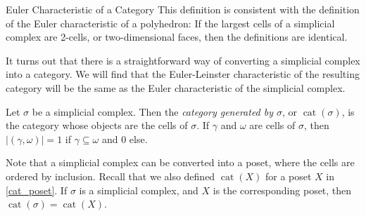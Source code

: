\documentclass[12pt]{pom_thesis}
\DeclareMathOperator{\cat}{cat}
\begin{document}
\begin{chapter}{Euler Characteristic of a Category}
This definition is consistent with the definition of the Euler characteristic of a polyhedron: If the largest cells of a simplicial complex are 2-cells, or two-dimensional faces, then the definitions are identical. 

It turns out that there is a straightforward way of converting a simplicial complex into a category. We will find that the Euler-Leinster characteristic of the resulting category will be the same as the Euler characteristic of the simplicial complex. 
\begin{defn}
Let $\sigma$ be a simplicial complex. Then the \emph{category generated by $\sigma$}, or $\cat(\sigma)$, is the category whose objects are the cells of $\sigma$. If $\gamma$ and $\omega$ are cells of $\sigma$, then $|(\gamma, \omega)| = 1$ if $\gamma \subseteq \omega$ and 0 else.
\end{defn}
Note that a simplicial complex can be converted into a poset, where the cells are ordered by inclusion. Recall that we also defined $\cat(X)$ for a poset $X$ in \ref{cat_poset}. If $\sigma$ is a simplicial complex, and $X$ is the corresponding poset, then $\cat(\sigma) = \cat(X)$.


\end{chapter}
\end{document}
